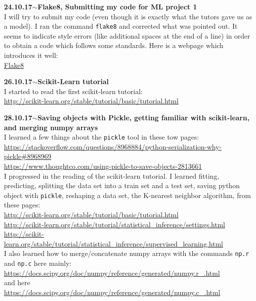 \documentclass[11pt,a4paper]{article}
\newenvironment{loggentry}[2]%
{\noindent\textbf{#1}\hspace{1cm}$\mathbf{\sim}$\text{ }\textbf{#2}\\}{\vspace{0.5cm}}
\begin{document}
\begin{loggentry}{24.10.17}{Flake8, Submitting my code for ML project 1}
I will try to submit my code (even though it is exactly what the tutors gave us as a model). I ran the command \texttt{flake8} and corrected what was pointed out. It seems to indicate style errors (like additional spaces at the end of a line) in order to obtain a code which follows some standards. Here is a webpage which introduces it well:\\
\href{https://medium.com/python-pandemonium/what-is-flake8-and-why-we-should-use-it-b89bd78073f2}{Flake8}
\end{loggentry}

\begin{loggentry}{26.10.17}{Scikit-Learn tutorial}
I started to read the first scikit-learn tutorial:\\
\url{http://scikit-learn.org/stable/tutorial/basic/tutorial.html}
\end{loggentry}

\begin{loggentry}{28.10.17}{Saving objects with Pickle, getting familiar with scikit-learn, and merging numpy arrays}
I learned a few things about the \texttt{pickle} tool in these tow pages:\\
\url{https://stackoverflow.com/questions/8968884/python-serialization-why-pickle#8968969}\\
\url{https://www.thoughtco.com/using-pickle-to-save-objects-2813661}\\
I progressed in the reading of the scikit-learn tutorial. I learned fitting, predicting, splitting the data set into a train set and a test set, saving python object with \texttt{pickle}, reshaping a data set, the K-nearest neighbor algorithm, from these pages:\\
\url{http://scikit-learn.org/stable/tutorial/basic/tutorial.html}\\
\url{http://scikit-learn.org/stable/tutorial/statistical_inference/settings.html}\\
\url{http://scikit-learn.org/stable/tutorial/statistical_inference/supervised_learning.html}\\
I also learned how to merge/concatenate numpy arrays with the commands \texttt{np.r} and \texttt{np.c} here mainly:\\
\url{https://docs.scipy.org/doc/numpy/reference/generated/numpy.r_.html}\\
and here\\
\url{https://docs.scipy.org/doc/numpy/reference/generated/numpy.c_.html}\\
\end{loggentry}
\end{document}
